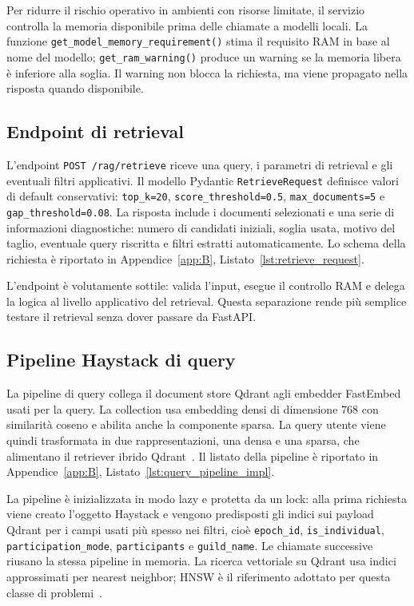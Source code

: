 Per ridurre il rischio operativo in ambienti con risorse limitate, il servizio
controlla la memoria disponibile prima delle chiamate a modelli locali. La
funzione \texttt{get\_model\_memory\_requirement()} stima il requisito RAM in
base al nome del modello; \texttt{get\_ram\_warning()} produce un warning se la
memoria libera è inferiore alla soglia. Il warning non blocca la richiesta, ma
viene propagato nella risposta quando disponibile.

\subsection{Endpoint di retrieval}
\label{subsec:implementation_retrieve_endpoint}

L'endpoint \texttt{POST /rag/retrieve} riceve una query, i parametri di
retrieval e gli eventuali filtri applicativi. Il modello Pydantic
\texttt{RetrieveRequest} definisce valori di default conservativi:
\texttt{top\_k=20}, \texttt{score\_threshold=0.5},
\texttt{max\_documents=5} e \texttt{gap\_threshold=0.08}. La risposta include
i documenti selezionati e una serie di informazioni diagnostiche: numero di
candidati iniziali, soglia usata, motivo del taglio, eventuale query riscritta e
filtri estratti automaticamente. Lo schema della richiesta è riportato in
Appendice~\ref{app:B}, Listato~\ref{lst:retrieve_request}.

L'endpoint è volutamente sottile: valida l'input, esegue il controllo RAM e
delega la logica al livello applicativo del retrieval. Questa separazione rende
più semplice testare il retrieval senza dover passare da FastAPI.

\subsection{Pipeline Haystack di query}
\label{subsec:implementation_query_pipeline}

La pipeline di query collega il document store Qdrant agli embedder FastEmbed
usati per la query. La collection usa embedding densi di dimensione 768 con
similarità coseno e abilita anche la componente sparsa. La query utente viene
quindi trasformata in due rappresentazioni, una densa e una sparsa, che
alimentano il retriever ibrido Qdrant~\cite{haystack2023,qdrant2023}. Il
listato della pipeline è riportato in Appendice~\ref{app:B},
Listato~\ref{lst:query_pipeline_impl}.

La pipeline è inizializzata in modo lazy e protetta da un lock: alla prima
richiesta viene creato l'oggetto Haystack e vengono predisposti gli indici sui
payload Qdrant per i campi usati più spesso nei filtri, cioè
\texttt{epoch\_id}, \texttt{is\_individual}, \texttt{participation\_mode},
\texttt{participants} e \texttt{guild\_name}. Le chiamate successive riusano la
stessa pipeline in memoria. La ricerca vettoriale su Qdrant usa indici
approssimati per nearest neighbor; HNSW è il riferimento adottato per questa
classe di problemi~\cite{malkov2018efficient}.

